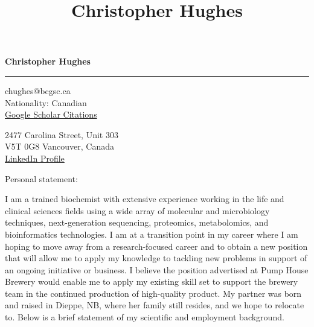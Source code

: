 \documentclass[11pt]{article}
\title{\bfseries\Huge Christopher Hughes}
\author{}
\date{}
\begin{document}
	\newpage
	\setcounter{page}{1}
	\noindent

\begin{LARGE}

	\noindent\textbf{Christopher Hughes}\vspace{1pt}

\end{LARGE}


\noindent\rule{\textwidth}{1pt}\vspace{9pt}

\noindent
\begin{minipage}{0.5\textwidth}
	\begin{flushleft}
		chughes@bcgsc.ca\\
		Nationality: Canadian\\ \href{https://scholar.google.com/citations?user=jPSwBGwAAAAJ}{Google Scholar Citations}
	\end{flushleft}
\end{minipage}%
\begin{minipage}{0.5\textwidth}
	\begin{flushright}
		2477 Carolina Street, Unit 303\\
		V5T 0G8 Vancouver, Canada\\ \href{https://www.linkedin.com/in/christopher-hughes-612460133/}{LinkedIn Profile}
	\end{flushright}
\end{minipage}\vspace{18pt}

\noindent
Personal statement:\vspace{12pt}

I am a trained biochemist with extensive experience working in the life and clinical sciences fields using a wide array of molecular and microbiology techniques, next-generation sequencing, proteomics, metabolomics, and bioinformatics technologies. I am at a transition point in my career where I am hoping to move away from a research-focused career and to obtain a new position that will allow me to apply my knowledge to tackling new problems in support of an ongoing initiative or business. I believe the position advertised at Pump House Brewery would enable me to apply my existing skill set to support the brewery team in the continued production of high-quality product. My partner was born and raised in Dieppe, NB, where her family still resides, and we hope to relocate to. Below is a brief statement of my scientific and employment background. 
\end{document}
